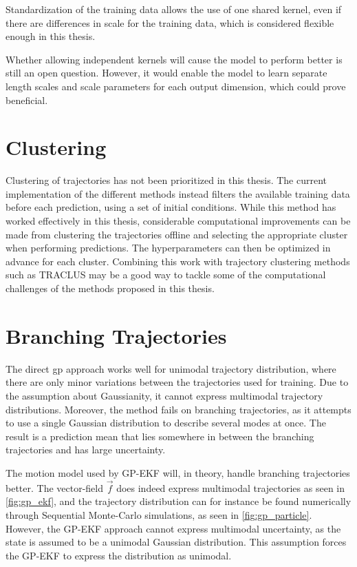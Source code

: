 Standardization of the training data allows the use of one shared kernel, even if there are differences in scale for the training data, which is considered flexible enough in this thesis.

Whether allowing independent kernels will cause the model to perform better is still an open question. However, it would enable the model to learn separate length scales and scale parameters for each output dimension, which could prove beneficial. 



\section{Clustering}
Clustering of trajectories has not been prioritized in this thesis. The current implementation of the different methods instead filters the available training data before each prediction, using a set of initial conditions. While this method has worked effectively in this thesis, considerable computational improvements can be made from clustering the trajectories offline and selecting the appropriate cluster when performing predictions. The hyperparameters can then be optimized in advance for each cluster. Combining this work with trajectory clustering methods such as TRACLUS \cite{traclus} may be a good way to tackle some of the computational challenges of the methods proposed in this thesis.



\section{Branching Trajectories}
The direct \acrshort{gp} approach works well for unimodal trajectory distribution, where there are only minor variations between the trajectories used for training. Due to the assumption about Gaussianity, it cannot express multimodal trajectory distributions. Moreover, the method fails on branching trajectories, as it attempts to use a single Gaussian distribution to describe several modes at once. The result is a prediction mean that lies somewhere in between the branching trajectories and has large uncertainty. 

The motion model used by GP-EKF will, in theory, handle branching trajectories better. The vector-field $\vec{f}$ does indeed express multimodal trajectories as seen in \cref{fig:gp_ekf}, and the trajectory distribution can for instance be found numerically through Sequential Monte-Carlo simulations, as seen in \cref{fig:gp_particle}. However, the GP-EKF approach cannot express multimodal uncertainty, as the state is assumed to be a unimodal Gaussian distribution. This assumption forces the GP-EKF to express the distribution as unimodal.  

